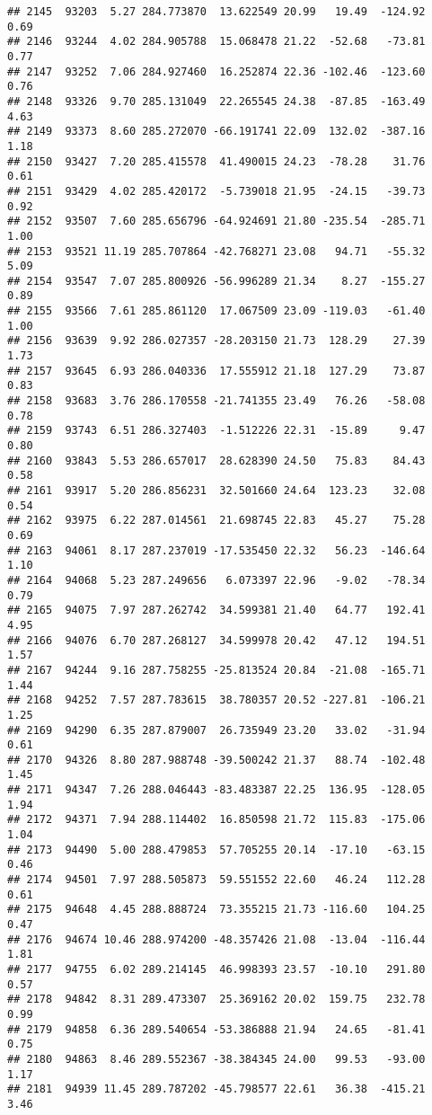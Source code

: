 \documentclass[]{article}
\begin{document}
\begin{verbatim}
## 2145  93203  5.27 284.773870  13.622549 20.99   19.49  -124.92  0.69
## 2146  93244  4.02 284.905788  15.068478 21.22  -52.68   -73.81  0.77
## 2147  93252  7.06 284.927460  16.252874 22.36 -102.46  -123.60  0.76
## 2148  93326  9.70 285.131049  22.265545 24.38  -87.85  -163.49  4.63
## 2149  93373  8.60 285.272070 -66.191741 22.09  132.02  -387.16  1.18
## 2150  93427  7.20 285.415578  41.490015 24.23  -78.28    31.76  0.61
## 2151  93429  4.02 285.420172  -5.739018 21.95  -24.15   -39.73  0.92
## 2152  93507  7.60 285.656796 -64.924691 21.80 -235.54  -285.71  1.00
## 2153  93521 11.19 285.707864 -42.768271 23.08   94.71   -55.32  5.09
## 2154  93547  7.07 285.800926 -56.996289 21.34    8.27  -155.27  0.89
## 2155  93566  7.61 285.861120  17.067509 23.09 -119.03   -61.40  1.00
## 2156  93639  9.92 286.027357 -28.203150 21.73  128.29    27.39  1.73
## 2157  93645  6.93 286.040336  17.555912 21.18  127.29    73.87  0.83
## 2158  93683  3.76 286.170558 -21.741355 23.49   76.26   -58.08  0.78
## 2159  93743  6.51 286.327403  -1.512226 22.31  -15.89     9.47  0.80
## 2160  93843  5.53 286.657017  28.628390 24.50   75.83    84.43  0.58
## 2161  93917  5.20 286.856231  32.501660 24.64  123.23    32.08  0.54
## 2162  93975  6.22 287.014561  21.698745 22.83   45.27    75.28  0.69
## 2163  94061  8.17 287.237019 -17.535450 22.32   56.23  -146.64  1.10
## 2164  94068  5.23 287.249656   6.073397 22.96   -9.02   -78.34  0.79
## 2165  94075  7.97 287.262742  34.599381 21.40   64.77   192.41  4.95
## 2166  94076  6.70 287.268127  34.599978 20.42   47.12   194.51  1.57
## 2167  94244  9.16 287.758255 -25.813524 20.84  -21.08  -165.71  1.44
## 2168  94252  7.57 287.783615  38.780357 20.52 -227.81  -106.21  1.25
## 2169  94290  6.35 287.879007  26.735949 23.20   33.02   -31.94  0.61
## 2170  94326  8.80 287.988748 -39.500242 21.37   88.74  -102.48  1.45
## 2171  94347  7.26 288.046443 -83.483387 22.25  136.95  -128.05  1.94
## 2172  94371  7.94 288.114402  16.850598 21.72  115.83  -175.06  1.04
## 2173  94490  5.00 288.479853  57.705255 20.14  -17.10   -63.15  0.46
## 2174  94501  7.97 288.505873  59.551552 22.60   46.24   112.28  0.61
## 2175  94648  4.45 288.888724  73.355215 21.73 -116.60   104.25  0.47
## 2176  94674 10.46 288.974200 -48.357426 21.08  -13.04  -116.44  1.81
## 2177  94755  6.02 289.214145  46.998393 23.57  -10.10   291.80  0.57
## 2178  94842  8.31 289.473307  25.369162 20.02  159.75   232.78  0.99
## 2179  94858  6.36 289.540654 -53.386888 21.94   24.65   -81.41  0.75
## 2180  94863  8.46 289.552367 -38.384345 24.00   99.53   -93.00  1.17
## 2181  94939 11.45 289.787202 -45.798577 22.61   36.38  -415.21  3.46

\end{verbatim}
\end{document}
